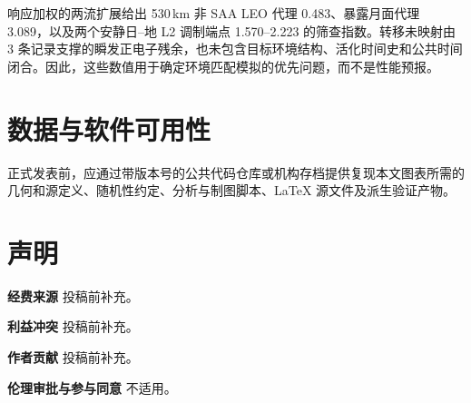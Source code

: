 \documentclass[11pt]{article}
\begin{document}
响应加权的两流扩展给出 530\,km 非 SAA LEO 代理 0.483、暴露月面代理 3.089，以及两个安静日--地 L2 调制端点 1.570--2.223 的筛查指数。转移未映射由 3 条记录支撑的瞬发正电子残余，也未包含目标环境结构、活化时间史和公共时间闭合。因此，这些数值用于确定环境匹配模拟的优先问题，而不是性能预报。

\section*{数据与软件可用性}
正式发表前，应通过带版本号的公共代码仓库或机构存档提供复现本文图表所需的几何和源定义、随机性约定、分析与制图脚本、LaTeX 源文件及派生验证产物。

\section*{声明}
\textbf{经费来源} 投稿前补充。

\textbf{利益冲突} 投稿前补充。

\textbf{作者贡献} 投稿前补充。

\textbf{伦理审批与参与同意} 不适用。
\end{document}
